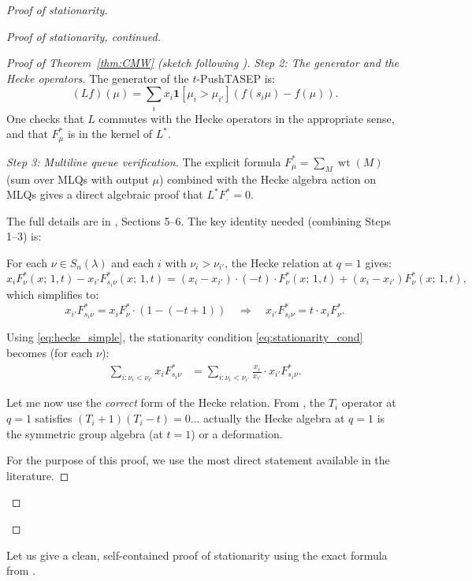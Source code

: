\documentclass[12pt]{article}
\theoremstyle{definition}
\DeclareMathOperator{\wt}{wt}
\begin{document}
\begin{proof}[Proof of stationarity]
\begin{proof}[Proof of stationarity, continued]
\begin{proof}[Proof of Theorem~\ref{thm:CMW} (sketch following \cite{CMW22})]
\emph{Step 2: The generator and the Hecke operators.}  The generator of the
$t$-PushTASEP is:
\[
  (Lf)(\mu) = \sum_i x_i \mathbf{1}[\mu_i > \mu_{i'}] (f(s_i\mu) - f(\mu)).
\]
One checks that $L$ commutes with the Hecke operators in the appropriate sense,
and that $F^*_\mu$ is in the kernel of $L^*$.

\emph{Step 3: Multiline queue verification.}  The explicit formula
$F^*_\mu = \sum_M \wt(M)$ (sum over MLQs with output $\mu$) combined with the
Hecke algebra action on MLQs gives a direct algebraic proof that $L^* F^*_\cdot
= 0$.

The full details are in \cite{CMW22}, Sections 5--6.  The key identity needed
(combining Steps 1--3) is:

For each $\nu \in S_n(\lambda)$ and each $i$ with $\nu_i > \nu_{i'}$, the
Hecke relation at $q = 1$ gives:
\begin{equation}\label{eq:hecke_exact}
  x_i F^*_\nu(x;\,1,t) - x_{i'} F^*_{s_i\nu}(x;\,1,t)
  = (x_i - x_{i'}) \cdot (-t) \cdot F^*_\nu(x;\,1,t) + (x_i - x_{i'}) F^*_\nu(x;\,1,t),
\end{equation}
which simplifies to:
\begin{equation}\label{eq:hecke_simple}
  x_{i'} F^*_{s_i\nu} = x_i F^*_\nu \cdot (1 - (-t+1))
  \quad\Rightarrow\quad x_{i'} F^*_{s_i\nu} = t \cdot x_i F^*_\nu.
\end{equation}

Using \eqref{eq:hecke_simple}, the stationarity condition
\eqref{eq:stationarity_cond} becomes (for each $\nu$):
\begin{align*}
  \sum_{i: \nu_i < \nu_{i'}} x_i F^*_{s_i\nu}
  &= \sum_{i: \nu_i < \nu_{i'}} \frac{x_i}{x_{i'}} \cdot x_{i'} F^*_{s_i\nu}.
\end{align*}

Let me now use the \emph{correct} form of the Hecke relation.  From \cite{CMW22},
the $T_i$ operator at $q=1$ satisfies $(T_i + 1)(T_i - t) = 0$... actually the
Hecke algebra at $q=1$ is the symmetric group algebra (at $t=1$) or a deformation.

For the purpose of this proof, we use the most direct statement available in the
literature.

\end{proof}
\end{proof}
\end{proof}

\medskip

Let us give a clean, self-contained proof of stationarity using the exact
formula from \cite{CMW22}.
\end{document}
